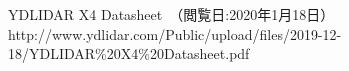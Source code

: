 \begin{thebibliography}{9}

   YDLIDAR X4 Datasheet　（閲覧日:2020年1月18日）\\
    http://www.ydlidar.com/Public/upload/files/2019-12-18/YDLIDAR\%20X4\%20Datasheet.pdf

\end{thebibliography}